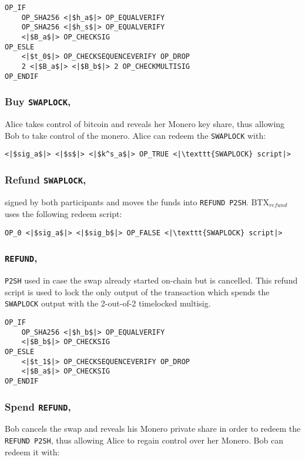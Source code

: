\documentclass{llncs}
\begin{document}
\begin{verbatim}
OP_IF
    OP_SHA256 <|$h_a$|> OP_EQUALVERIFY
    OP_SHA256 <|$h_s$|> OP_EQUALVERIFY
    <|$B_a$|> OP_CHECKSIG
OP_ESLE
    <|$t_0$|> OP_CHECKSEQUENCEVERIFY OP_DROP
    2 <|$B_a$|> <|$B_b$|> 2 OP_CHECKMULTISIG
OP_ENDIF
\end{verbatim}

\subsubsection{Buy \texttt{SWAPLOCK},}
Alice takes control of bitcoin and reveals her Monero key share, thus allowing Bob to take control of the monero. Alice can redeem the \texttt{SWAPLOCK} with:

\begin{verbatim}
<|$sig_a$|> <|$s$|> <|$k^s_a$|> OP_TRUE <|\texttt{SWAPLOCK} script|>
\end{verbatim}

\subsubsection{Refund \texttt{SWAPLOCK},}
signed by both participants and moves the funds into \texttt{REFUND P2SH}. $\text{BTX}_\textit{refund}$ uses the following redeem script:

\begin{verbatim}
OP_0 <|$sig_a$|> <|$sig_b$|> OP_FALSE <|\texttt{SWAPLOCK} script|>
\end{verbatim}

\subsubsection{\texttt{REFUND},}
\texttt{P2SH} used in case the swap already started on-chain but is cancelled. This refund script is used to lock the only output of the transaction which spends the \texttt{SWAPLOCK} output with the 2-out-of-2 timelocked multisig.

\begin{verbatim}
OP_IF
    OP_SHA256 <|$h_b$|> OP_EQUALVERIFY
    <|$B_b$|> OP_CHECKSIG
OP_ESLE
    <|$t_1$|> OP_CHECKSEQUENCEVERIFY OP_DROP
    <|$B_a$|> OP_CHECKSIG
OP_ENDIF
\end{verbatim}

\subsubsection{Spend \texttt{REFUND},}
Bob cancels the swap and reveals his Monero private share in order to redeem the \texttt{REFUND P2SH}, thus allowing Alice to regain control over her Monero. Bob can redeem it with:
\end{document}
